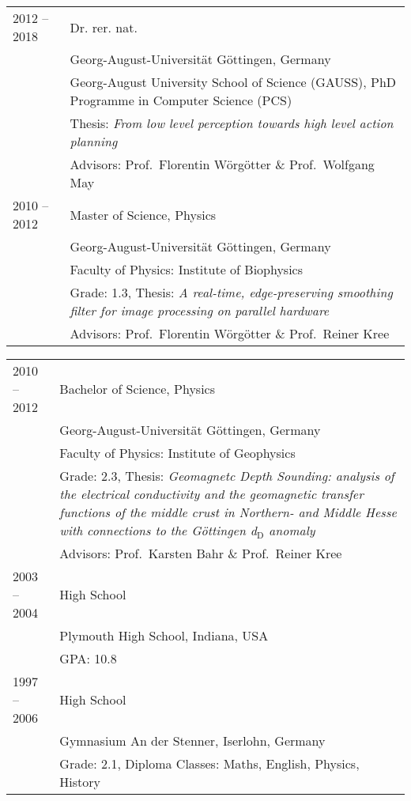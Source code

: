 \hspace{0.5cm}\begin{tabular}{ p{2.5cm} p{10.3cm} }
  2012 -- 2018  & Dr. rer. nat.\\
                & Georg-August-Universit\"at G\"ottingen, Germany\\
                & Georg-August University School of Science (GAUSS), PhD Programme in Computer Science (PCS)\\
                & Thesis: \textit{From low level perception towards high level action planning}\\
                & Advisors: Prof.~Florentin W\"org\"otter \& Prof.~Wolfgang May\vspace{0.5cm}\\
%
  2010 -- 2012  & Master of Science, Physics\\
                & Georg-August-Universit\"at G\"ottingen, Germany\\
                & Faculty of Physics: Institute of Biophysics\\
                & Grade: 1.3, Thesis: \textit{A real-time, edge-preserving smoothing filter for image processing on parallel hardware}\\
                & Advisors: Prof.~Florentin W\"org\"otter \& Prof.~Reiner Kree\vspace{0.5cm}\\
%
\end{tabular}
\newpage
\hspace{0.5cm}\begin{tabular}{ p{2.5cm} p{10.3cm} }
  2010 -- 2012  & Bachelor of Science, Physics\\
                & Georg-August-Universit\"at G\"ottingen, Germany\\
                & Faculty of Physics: Institute of Geophysics\\
                & Grade: 2.3, Thesis: \textit{Geomagnetc Depth Sounding: analysis of the electrical conductivity and the geomagnetic transfer functions of the middle crust in Northern- and Middle Hesse with connections to the G\"ottingen d$_{\textrm{D}}$ anomaly}\\
                & Advisors: Prof.~Karsten Bahr \& Prof.~Reiner Kree\vspace{0.5cm}\\
%
  2003 -- 2004  & High School\\
                & Plymouth High School, Indiana, USA\\
                & GPA: 10.8\vspace{0.5cm}\\
%
  1997 -- 2006  & High School\\
                & Gymnasium An der Stenner, Iserlohn, Germany\\
                & Grade: 2.1, Diploma Classes: Maths, English, Physics, History\vspace{0.5cm}\\
\end{tabular}


